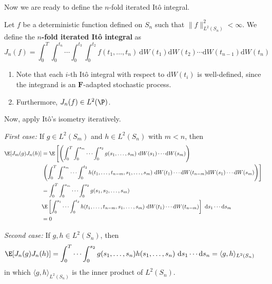 Now we are ready to define the \(n\)-fold iterated Itô integral.

\begin{definition}
    Let \(f\) be a deterministic function defined on
    \(S_n\) such that \(\| f \|_{L^2(S_n)}^2 < \infty\). We define the
    \textbf{\(n\)-fold iterated Itô integral} as \[
    J_n(f) = \int_0^T \int_0^{t_n} \cdots \int_0^{t_3} \int_0^{t_2} f(t_1, \ldots, t_n) ~\mathrm{d}W(t_1) \mathrm{d}W(t_2) \cdots \mathrm{d}W(t_{n-1}) \mathrm{d}W(t_n)
    \]
\end{definition}

\begin{remark}
    \begin{enumerate}
        \def\labelenumi{\arabic{enumi}.}
        \item
          Note that each \(i\)-th Itô integral with respect to
          \(\mathrm{d}W(t_i)\) is well-defined, since the integrand is an
          \(\mathbf{F}\)-adapted stochastic process.
        \item
          Furthermore, \(J_n(f) \in L^2(\P)\).
    \end{enumerate}
\end{remark}

Now, apply Itô's isometry iteratively. %

\emph{First case:} If \(g \in L^2(S_m)\) and \(h \in L^2(S_n)\) with
\(m < n\), then \[
\begin{aligned}
    \E[J_m(g) J_n(h)] &= \E \left[ \left( \int_0^T \int_0^{s_m} \cdots \int_0^{s_2} g(s_1, \ldots, s_m) ~\mathrm{d}W(s_1) \cdots \mathrm{d}W(s_m) \right) \right. \\
    & \left. \left( \int_0^T \int_0^{s_m} \cdots \int_0^{t_2} h(t_1, \ldots, t_{n-m}, s_1, \ldots, s_m) ~\mathrm{d}W(t_1) \cdots \mathrm{d}W(t_{n-m}) \mathrm{d}W(s_1) \cdots \mathrm{d}W(s_m) \right) \right] \\
    &= \int_0^T \int_0^{s_m} \cdots \int_0^{s_2} g(s_1, s_2, \ldots, s_m)  \\
    &\E \left[ \int_0^{s_1} \cdots \int_0^{t_2} h(t_1, \ldots, t_{n-m}, s_1, \ldots, s_m) ~\mathrm{d}W(t_1) \cdots \mathrm{d}W(t_{n-m}) \right] ~\mathrm{d}s_1 \cdots \mathrm{d}s_m \\
    &= 0
\end{aligned}
\]

\emph{Second case:} If \(g, h \in L^2(S_n)\), then \[
\begin{aligned}
    \E[J_n(g) J_n(h)] &= \int_0^T \cdots \int_0^{s_2} g(s_1, \ldots, s_n) h(s_1, \ldots, s_n) ~\mathrm{d}s_1 \cdots \mathrm{d}s_n = \langle g, h \rangle_{L^2(S_n)}
\end{aligned}
\] in which \(\langle g, h \rangle_{L^2(S_n)}\) is the inner product of
\(L^2(S_n)\).

